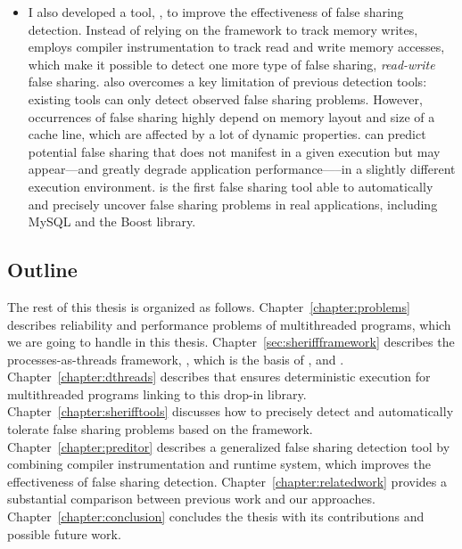 \begin{itemize}
\item I also developed a tool, \predator{}, to improve the effectiveness of false sharing detection. Instead of relying on the \sheriff{} framework to track memory writes, \predator{} employs compiler instrumentation to track read and write memory accesses, which make it possible to detect one more type of false sharing, {\it read-write} false sharing. \Predator{} also overcomes a key limitation of previous detection tools: existing tools can only detect observed false sharing problems. However, occurrences of false sharing highly depend on memory layout and size of a cache line, which are affected by a lot of dynamic properties. \Predator{} can predict potential false sharing that does not manifest in a given execution but may appear---and greatly degrade application performance—--in a slightly different execution environment. \Predator{} is the first false sharing tool able to automatically and precisely uncover false sharing problems in real applications, including MySQL and the Boost library.


\end{itemize}

\subsection*{Outline}
The rest of this thesis is organized as follows. Chapter~\ref{chapter:problems} describes reliability and performance problems of multithreaded programs, which we are going to handle in this thesis. Chapter~\ref{sec:sheriffframework} describes the processes-as-threads framework, \sheriff{}, which is the basis of \dthreads{}, \SheriffDetect{} and \SheriffProtect{}. Chapter~\ref{chapter:dthreads} describes \dthreads{} that ensures deterministic execution for multithreaded programs linking to this drop-in library. Chapter~\ref{chapter:sherifftools} discusses how to precisely detect and automatically tolerate false sharing problems based on the \sheriff{} framework. Chapter~\ref{chapter:preditor} describes a generalized false sharing detection tool by combining compiler instrumentation and runtime system, which improves the effectiveness of false sharing detection. 
Chapter~\ref{chapter:relatedwork} provides a substantial comparison between previous work and our approaches.  Chapter~\ref{chapter:conclusion} concludes the thesis with its contributions and possible future work. 



